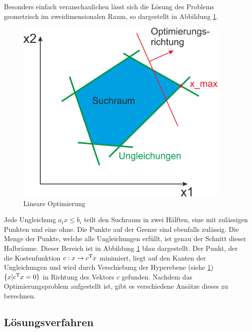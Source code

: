 \documentclass{like}
\begin{document}
Besonders einfach veranschaulichen lässt sich die Lösung des Problems geometrisch im zweidimensionalen Raum, so dargestellt in Abbildung \ref*{fig:linOpt}.

\begin{figure}[ht!]
	\centering
	\includegraphics[width=300pt]{Abbildungen/linearOpt.png}
	\caption{Lineare Optimierung}
	\label{fig:linOpt}
\end{figure}

Jede Ungleichung $a_i x \leq b_i$ teilt den Suchraum in zwei Hälften, eine mit zulässigen Punkten und eine ohne. Die Punkte auf der Grenze sind ebenfalls zulässig. Die Menge der Punkte, welche alle Ungleichungen erfüllt, ist genau der Schnitt dieser Halbräume. Dieser Bereich ist in Abbildung \ref{fig:linOpt} blau dargestellt. Der Punkt, der die Kostenfunktion $c: x \rightarrow c\textsuperscript{T} x$ minimiert, liegt auf den Kanten der Ungleichungen und wird durch Verschiebung der Hyperebene (siehe \ref{fig:linOpt}) $ \{x| c\textsuperscript{T} x = 0 \}$ in Richtung des Vektors \(c\) gefunden. Nachdem das Optimierungsproblem aufgestellt ist, gibt es verschiedene Ansätze dieses zu berechnen.


\subsection*{Lösungsverfahren}
\end{document}
